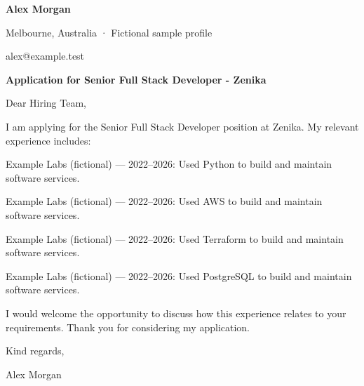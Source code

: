 \documentclass[10pt,a4paper]{article}
\begin{document}
{\LARGE\bfseries\color{navy} Alex Morgan}\par
Melbourne, Australia · Fictional sample profile\par
alex@example.test\par
{\large\bfseries\color{navy} Application for Senior Full Stack Developer - Zenika}\par
Dear Hiring Team,\par
I am applying for the Senior Full Stack Developer position at Zenika. My relevant experience includes:\par
Example Labs (fictional) — 2022–2026: Used Python to build and maintain software services.\par
Example Labs (fictional) — 2022–2026: Used AWS to build and maintain software services.\par
Example Labs (fictional) — 2022–2026: Used Terraform to build and maintain software services.\par
Example Labs (fictional) — 2022–2026: Used PostgreSQL to build and maintain software services.\par
I would welcome the opportunity to discuss how this experience relates to your requirements. Thank you for considering my application.\par
Kind regards,\par
Alex Morgan\par
\end{document}
